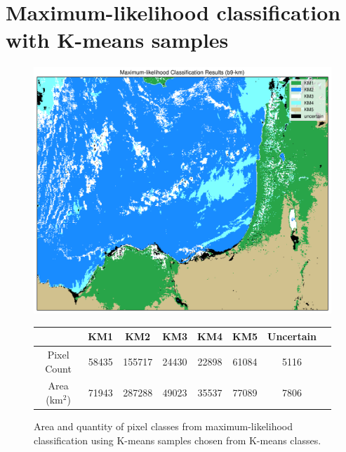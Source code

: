 \documentclass[12pt]{article}
\begin{document}
\clearpage

\section{Maximum-likelihood classification with K-means samples}

\begin{figure}[h!]
    \centering

    \includegraphics[width=.85\textwidth]{figs/class/mlc_b9-km_6c.png}

    \caption{}
    \label{mlc_km_results}
\end{figure}


\begin{figure}[h!]
    \centering
    \begin{tabular}{c|ccccccc}
    & KM1 & KM2 & KM3 & KM4 & KM5 & Uncertain\\
    \hline
    Pixel Count & 58435 & 155717 & 24430 & 22898 & 61084 & 5116\\
    Area (km$^2$) & 71943 & 287288 & 49023 & 35537 & 77089 & 7806\\
    \end{tabular}
    \caption{Area and quantity of pixel classes from maximum-likelihood classification using K-means samples chosen from K-means classes.}
    \label{mlc_km_areas}
\end{figure}


\clearpage
\end{document}
